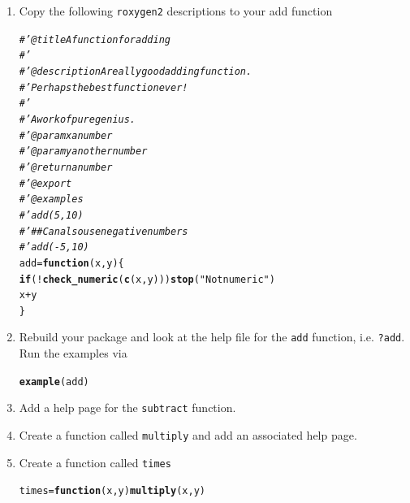 \documentclass[a4paper,justified,openany]{tufte-handout}\usepackage[]{graphicx}\usepackage[]{color}
\makeatletter
\newcommand{\hlstr}[1]{\textcolor[rgb]{0.192,0.494,0.8}{#1}}%
\newcommand{\hlcom}[1]{\textcolor[rgb]{0.678,0.584,0.686}{\textit{#1}}}%
\newcommand{\hlopt}[1]{\textcolor[rgb]{0,0,0}{#1}}%
\newcommand{\hlstd}[1]{\textcolor[rgb]{0.345,0.345,0.345}{#1}}%
\newcommand{\hlkwa}[1]{\textcolor[rgb]{0.161,0.373,0.58}{\textbf{#1}}}%
\newcommand{\hlkwb}[1]{\textcolor[rgb]{0.69,0.353,0.396}{#1}}%
\newcommand{\hlkwc}[1]{\textcolor[rgb]{0.333,0.667,0.333}{#1}}%
\newcommand{\hlkwd}[1]{\textcolor[rgb]{0.737,0.353,0.396}{\textbf{#1}}}%
\newenvironment{kframe}{%
 \def\at@end@of@kframe{}%
 \ifinner\ifhmode%
  \def\at@end@of@kframe{\end{minipage}}%
  \begin{minipage}{\columnwidth}%
 \fi\fi%
 \def\FrameCommand##1{\hskip\@totalleftmargin \hskip-\fboxsep
 \colorbox{shadecolor}{##1}\hskip-\fboxsep
     \hskip-\linewidth \hskip-\@totalleftmargin \hskip\columnwidth}%
 \MakeFramed {\advance\hsize-\width
   \@totalleftmargin\z@ \linewidth\hsize
   \@setminipage}}%
 {\par\unskip\endMakeFramed%
 \at@end@of@kframe}
\newenvironment{knitrout}{}{} %
\newcommand{\cc}{\texttt}
\makeatother
\begin{document}
\begin{enumerate}
\item Copy the following \cc{roxygen2} descriptions to your add function
\begin{knitrout}
\color{fgcolor}\begin{kframe}
\begin{alltt}
\hlcom{#' @title A function for adding}
\hlcom{#'}
\hlcom{#' @description A really good adding function.}
\hlcom{#' Perhaps the best function ever!}
\hlcom{#'}
\hlcom{#' A work of pure genius.}
\hlcom{#' @param x a number}
\hlcom{#' @param y another number}
\hlcom{#' @return a number}
\hlcom{#' @export}
\hlcom{#' @examples}
\hlcom{#' add(5, 10)}
\hlcom{#' ## Can also use negative numbers}
\hlcom{#' add(-5, 10)}
\hlstd{add} \hlkwb{=} \hlkwa{function}\hlstd{(}\hlkwc{x}\hlstd{,} \hlkwc{y}\hlstd{) \{}
  \hlkwa{if}\hlstd{(}\hlopt{!}\hlkwd{check_numeric}\hlstd{(}\hlkwd{c}\hlstd{(x, y)))} \hlkwd{stop}\hlstd{(}\hlstr{"Not numeric"}\hlstd{)}
  \hlstd{x} \hlopt{+} \hlstd{y}
\hlstd{\}}
\end{alltt}
\end{kframe}
\end{knitrout}
\item Rebuild your package and look at the help file for the \cc{add} function,
  i.e. \cc{?add}. Run the examples via
\begin{knitrout}
\color{fgcolor}\begin{kframe}
\begin{alltt}
\hlkwd{example}\hlstd{(add)}
\end{alltt}
\end{kframe}
\end{knitrout}
\item Add a help page for the \cc{subtract} function.
\item Create a function called \cc{multiply} and add an associated help page.
\item Create a function called \cc{times}
\begin{knitrout}
\color{fgcolor}\begin{kframe}
\begin{alltt}
\hlstd{times} \hlkwb{=} \hlkwa{function}\hlstd{(}\hlkwc{x}\hlstd{,} \hlkwc{y}\hlstd{)} \hlkwd{multiply}\hlstd{(x, y)}
\end{alltt}
\end{kframe}

\end{knitrout}
\end{enumerate}
\end{document}
